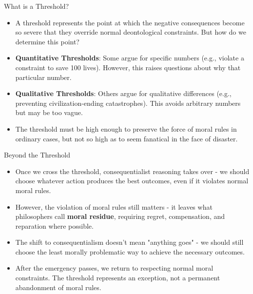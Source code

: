 \documentclass{beamer}
\begin{document}
\begin{frame}{What is a Threshold?}
\begin{itemize}
    \item A threshold represents the point at which the negative consequences become so severe that they override normal deontological constraints. But how do we determine this point?
    
    \item \textbf{Quantitative Thresholds}: Some argue for specific numbers (e.g., violate a constraint to save 100 lives). However, this raises questions about why that particular number.
    
    \item \textbf{Qualitative Thresholds}: Others argue for qualitative differences (e.g., preventing civilization-ending catastrophes). This avoids arbitrary numbers but may be too vague.
    
    \item The threshold must be high enough to preserve the force of moral rules in ordinary cases, but not so high as to seem fanatical in the face of disaster.
\end{itemize}
\end{frame}

\begin{frame}{Beyond the Threshold}
\begin{itemize}
    \item Once we cross the threshold, consequentialist reasoning takes over - we should choose whatever action produces the best outcomes, even if it violates normal moral rules.
    
    \item However, the violation of moral rules still matters - it leaves what philosophers call \textbf{moral residue}, requiring regret, compensation, and reparation where possible.
    
    \item The shift to consequentialism doesn't mean "anything goes" - we should still choose the least morally problematic way to achieve the necessary outcomes.
    
    \item After the emergency passes, we return to respecting normal moral constraints. The threshold represents an exception, not a permanent abandonment of moral rules.
\end{itemize}
\end{frame}
\end{document}
